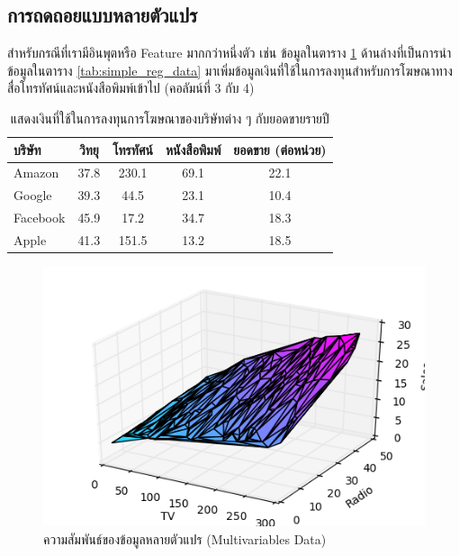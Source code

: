 \subsection{การถดถอยแบบหลายตัวแปร}
\label{ssec:multi_lin_res}

สำหรับกรณีที่เรามีอินพุตหรือ Feature มากกว่าหนึ่งตัว เช่น ข้อมูลในตาราง \ref{tab:multi_reg_data} ด้านล่างที่เป็นการนำข้อมูลในตาราง
\ref{tab:simple_reg_data} มาเพิ่มข้อมูลเงินที่ใช้ในการลงทุนสำหรับการโฆษณาทางสื่อโทรทัศน์และหนังสือพิมพ์เข้าไป (คอลัมน์ที่ 3 กับ 4)

\begin{table}[H]
    \centering
    \caption{แสดงเงินที่ใช้ในการลงทุนการโฆษณาของบริษัทต่าง ๆ กับยอดขายรายปี}
    \label{tab:multi_reg_data}
    \begin{tabular}{lcccc}\toprule
        \textbf{บริษัท} & \textbf{วิทยุ} & \textbf{โทรทัศน์} & \textbf{หนังสือพิมพ์} & \textbf{ยอดขาย (ต่อหน่วย)} \\\midrule
        Amazon        & 37.8         & 230.1           & 69.1              & 22.1                     \\
        Google        & 39.3         & 44.5            & 23.1              & 10.4                     \\
        Facebook      & 45.9         & 17.2            & 34.7              & 18.3                     \\
        Apple         & 41.3         & 151.5           & 13.2              & 18.5                     \\
        \bottomrule
    \end{tabular}
\end{table}

\begin{figure}[H]
    \centering
    \includegraphics[width=0.8\linewidth]{fig/plot_multivar_reg.png}
    \caption{ความสัมพันธ์ของข้อมูลหลายตัวแปร (Multivariables Data)}
    \label{fig:multi_var_reg}
\end{figure}

